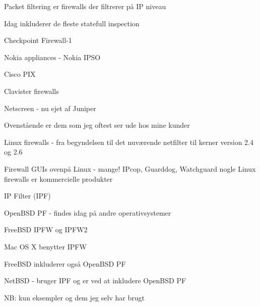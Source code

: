 \documentclass[Screen16to9,17pt]{foils}
\begin{document}
\begin{list1}
\item Packet filtering er firewalls der filtrerer på IP niveau
\item Idag inkluderer de fleste statefull inspection
\end{list1}

\begin{list2}
\item Checkpoint Firewall-1 
\item Nokia appliances - Nokia IPSO 
\item Cisco PIX 
\item Clavister firewalls 
\item Netscreen - nu ejet af Juniper
\end{list2}

Ovenstående er dem som jeg oftest ser ude hos mine kunder

\begin{list2}
\item Linux firewalls - fra begyndelsen til det nuværende netfilter
  til kerner version 2.4 og 2.6\\
\item Firewall GUIs ovenpå Linux - mange! IPcop, Guarddog, Watchguard
nogle Linux firewalls er kommercielle produkter
\item IP Filter (IPF) 
\item OpenBSD PF - findes idag på andre operativsystemer
\item FreeBSD IPFW og IPFW2 
\item Mac OS X benytter IPFW
\item FreeBSD inkluderer også OpenBSD PF
\item NetBSD - bruger IPF og er ved at inkludere OpenBSD PF
\end{list2}

NB: kun eksempler og dem jeg selv har brugt


\end{document}
